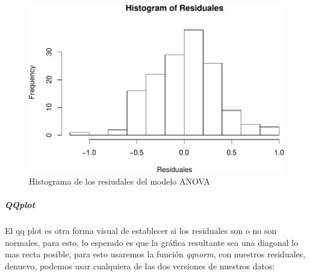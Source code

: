 \documentclass[]{article}
\newenvironment{Shaded}{\begin{snugshade}}{\end{snugshade}}
\newcommand{\KeywordTok}[1]{\textcolor[rgb]{0.13,0.29,0.53}{\textbf{#1}}}
\newcommand{\OperatorTok}[1]{\textcolor[rgb]{0.81,0.36,0.00}{\textbf{#1}}}
\newcommand{\NormalTok}[1]{#1}
\let\oldsubparagraph\subparagraph
\renewcommand{\subparagraph}[1]{\oldsubparagraph{#1}\mbox{}}
\begin{document}
\begin{Shaded}
\end{Shaded}

\begin{figure}
\centering
\includegraphics{Guia3_files/figure-latex/unnamed-chunk-9-1.pdf}
\caption{Histograma de los resiudales del modelo ANOVA}
\end{figure}

\subparagraph{QQplot}\label{qqplot}

El qq plot es otra forma visual de establecer si los residuales son o no
son normales, para esto, lo esperado es que la gráfica resultante sea
una diagonal lo mas recta posible, para esto usaremos la función
\emph{qqnorm}, con nuestros residuales, denuevo, podemos usar cualquiera
de las dos versiones de nuestros datos:

\begin{Shaded}
\end{Shaded}
\end{document}
